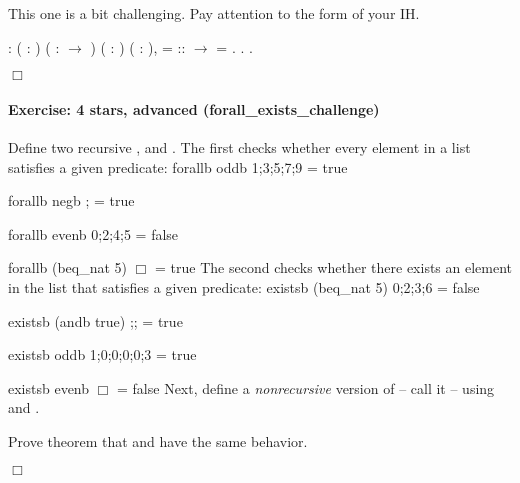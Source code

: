 \documentclass[12pt]{report}
\begin{document}
 This one is a bit challenging.  Pay attention to the form of your IH. \begin{coqdoccode}
\coqdocemptyline
\coqdocnoindent
{}  : \coqdockw{\ensuremath{\forall}} ( : ) ( :  \ensuremath{\rightarrow} )\coqdoceol
\coqdocindent{14.50em}
( : ) (  :  ),\coqdoceol
\coqdocindent{2.50em}
   =  ::  \ensuremath{\rightarrow}\coqdoceol
\coqdocindent{2.50em}
  = .\coqdoceol
\coqdocnoindent
{}.\coqdoceol
 .\coqdoceol
\end{coqdoccode}
\ensuremath{\Box} 

\paragraph{Exercise: 4 stars, advanced (forall\_exists\_challenge)}

 Define two recursive ,  and .  The
    first checks whether every element in a list satisfies a given
    predicate:
      forallb oddb 1;3;5;7;9 = true


      forallb negb ; = true


      forallb evenb 0;2;4;5 = false


      forallb (beq\_nat 5) \ensuremath{\Box} = true
    The second checks whether there exists an element in the list that
    satisfies a given predicate:
      existsb (beq\_nat 5) 0;2;3;6 = false


      existsb (andb true) ;; = true


      existsb oddb 1;0;0;0;0;3 = true


      existsb evenb \ensuremath{\Box} = false
    Next, define a \textit{nonrecursive} version of  -- call it
     -- using  and .


    Prove theorem  that  and  have
    the same behavior.
\begin{coqdoccode}
\coqdocemptyline
\end{coqdoccode}
\ensuremath{\Box} 
\end{document}
